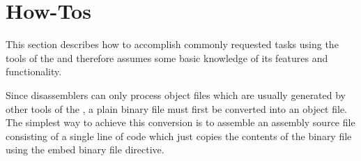 \section{How-Tos}

This section describes how to accomplish commonly requested tasks using the tools of the \ecs{} and therefore assumes some basic knowledge of its features and functionality.


Since disassemblers can only process object files which are usually generated by other tools of the \ecs{}, a plain binary file must first be converted into an object file.
The simplest way to achieve this conversion is to assemble an assembly source file consisting of a single line of code which just copies the contents of the binary file using the embed binary file directive.

\concludechapter
